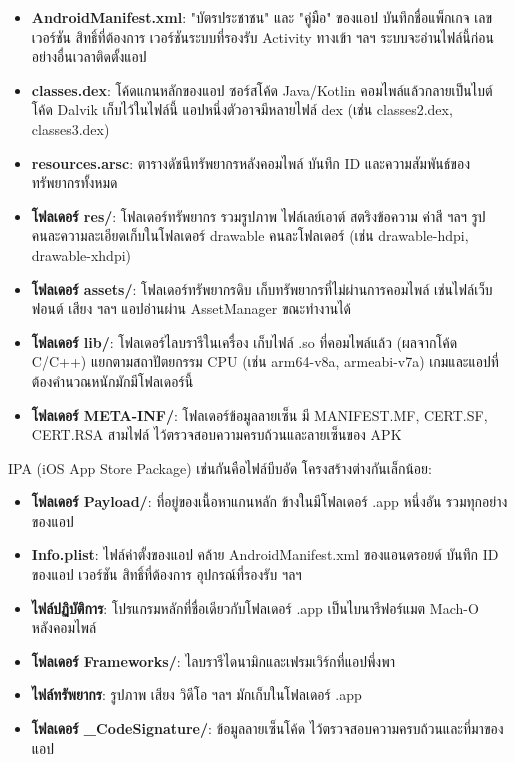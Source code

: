 \begin{itemize}
  \item \textbf{AndroidManifest.xml}: "บัตรประชาชน" และ "คู่มือ" ของแอป บันทึกชื่อแพ็กเกจ เลขเวอร์ชัน สิทธิ์ที่ต้องการ เวอร์ชันระบบที่รองรับ Activity ทางเข้า ฯลฯ ระบบจะอ่านไฟล์นี้ก่อนอย่างอื่นเวลาติดตั้งแอป
  \item \textbf{classes.dex}: โค้ดแกนหลักของแอป ซอร์สโค้ด Java/Kotlin คอมไพล์แล้วกลายเป็นไบต์โค้ด Dalvik เก็บไว้ในไฟล์นี้ แอปหนึ่งตัวอาจมีหลายไฟล์ dex (เช่น classes2.dex, classes3.dex)
  \item \textbf{resources.arsc}: ตารางดัชนีทรัพยากรหลังคอมไพล์ บันทึก ID และความสัมพันธ์ของทรัพยากรทั้งหมด
  \item \textbf{โฟลเดอร์ res/}: โฟลเดอร์ทรัพยากร รวมรูปภาพ ไฟล์เลย์เอาต์ สตริงข้อความ ค่าสี ฯลฯ รูปคนละความละเอียดเก็บในโฟลเดอร์ drawable คนละโฟลเดอร์ (เช่น drawable-hdpi, drawable-xhdpi)
  \item \textbf{โฟลเดอร์ assets/}: โฟลเดอร์ทรัพยากรดิบ เก็บทรัพยากรที่ไม่ผ่านการคอมไพล์ เช่นไฟล์เว็บ ฟอนต์ เสียง ฯลฯ แอปอ่านผ่าน AssetManager ขณะทำงานได้
  \item \textbf{โฟลเดอร์ lib/}: โฟลเดอร์ไลบรารีในเครื่อง เก็บไฟล์ .so ที่คอมไพล์แล้ว (ผลจากโค้ด C/C++) แยกตามสถาปัตยกรรม CPU (เช่น arm64-v8a, armeabi-v7a) เกมและแอปที่ต้องคำนวณหนักมักมีโฟลเดอร์นี้
  \item \textbf{โฟลเดอร์ META-INF/}: โฟลเดอร์ข้อมูลลายเซ็น มี MANIFEST.MF, CERT.SF, CERT.RSA สามไฟล์ ไว้ตรวจสอบความครบถ้วนและลายเซ็นของ APK
\end{itemize}


IPA (iOS App Store Package) เช่นกันคือไฟล์บีบอัด โครงสร้างต่างกันเล็กน้อย:

\begin{itemize}
  \item \textbf{โฟลเดอร์ Payload/}: ที่อยู่ของเนื้อหาแกนหลัก ข้างในมีโฟลเดอร์ .app หนึ่งอัน รวมทุกอย่างของแอป
  \item \textbf{Info.plist}: ไฟล์ค่าตั้งของแอป คล้าย AndroidManifest.xml ของแอนดรอยด์ บันทึก ID ของแอป เวอร์ชัน สิทธิ์ที่ต้องการ อุปกรณ์ที่รองรับ ฯลฯ
  \item \textbf{ไฟล์ปฏิบัติการ}: โปรแกรมหลักที่ชื่อเดียวกับโฟลเดอร์ .app เป็นไบนารีฟอร์แมต Mach-O หลังคอมไพล์
  \item \textbf{โฟลเดอร์ Frameworks/}: ไลบรารีไดนามิกและเฟรมเวิร์กที่แอปพึ่งพา
  \item \textbf{ไฟล์ทรัพยากร}: รูปภาพ เสียง วิดีโอ ฯลฯ มักเก็บในโฟลเดอร์ .app
  \item \textbf{โฟลเดอร์ \_CodeSignature/}: ข้อมูลลายเซ็นโค้ด ไว้ตรวจสอบความครบถ้วนและที่มาของแอป
\end{itemize}


